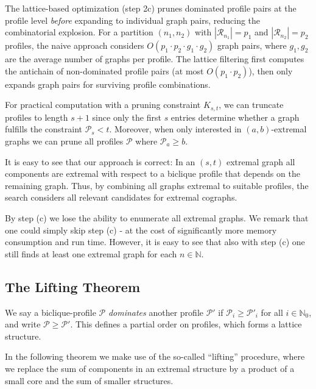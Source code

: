 \documentclass{article}
\newcommand{\NN}{\mathbb{N}}
\theoremstyle{definition}
\theoremstyle{definition}
\theoremstyle{definition}
\theoremstyle{definition}
\theoremstyle{definition}
\theoremstyle{definition}
\theoremstyle{definition}
\theoremstyle{definition}
\theoremstyle{definition}
\theoremstyle{definition}
\begin{document}
The lattice-based optimization (step 2c) prunes dominated profile pairs at the profile level \emph{before} expanding to individual graph pairs, reducing the combinatorial explosion.
For a partition $(n_1, n_2)$ with $|\mathcal{R}_{n_1}| = p_1$ and $|\mathcal{R}_{n_2}| = p_2$ profiles, the naive approach considers $O(p_1 \cdot p_2 \cdot g_1 \cdot g_2)$ graph pairs, where $g_1, g_2$ are the average number of graphs per profile.
The lattice filtering first computes the antichain of non-dominated profile pairs (at most $O(p_1 \cdot p_2)$), then only expands graph pairs for surviving profile combinations.

For practical computation with a pruning constraint $K_{s,t}$, we can truncate profiles to length $s+1$ since only the first $s$ entries determine whether a graph fulfills the constraint $\mathscr{P}_s < t$. Moreover, when only interested in $(a,b)$-extremal graphs we can prune all profiles $\mathscr{P}$ where $\mathscr{P}_a \geq b$.

It is easy to see that our approach is correct: In an $(s,t)$ extremal graph all components are extremal with respect to a biclique profile that depends on the remaining graph. Thus, by combining all graphs extremal to suitable profiles, the search considers all relevant candidates for extremal cographs.

By step (c) we lose the ability to enumerate all extremal graphs. We remark that one could simply skip step (c) - at the cost of significantly more memory consumption and run time. However, it is easy to see that also with step (c) one still finds at least one extremal graph for each $n \in \NN$.

\subsection{The Lifting Theorem} \label{subsec:lifting}

We say a biclique-profile $\mathscr{P}$ \emph{dominates} another profile $\mathscr{P}'$ if $\mathscr{P}_i \geq \mathscr{P}'_i$ for all $i \in \NN_0$, and write $\mathscr{P} \geq \mathscr{P}'$.
This defines a partial order on profiles, which forms a lattice structure.

In the following theorem we make use of the so-called ``lifting'' procedure, where we replace the sum of components in an extremal structure by a product of a small core and the sum of smaller structures.
\end{document}
